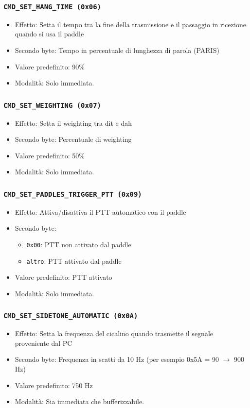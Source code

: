 \subsubsection{\texttt{CMD\_SET\_HANG\_TIME (0x06)}}
\begin{itemize}
	\item Effetto: Setta il tempo tra la fine della trasmissione e il passaggio in ricezione quando si usa il paddle
	\item Secondo byte: Tempo in percentuale di lunghezza di parola (PARIS)
	\item Valore predefinito: 90\%
	\item Modalit\`a: Solo immediata.
\end{itemize}

\subsubsection{\texttt{CMD\_SET\_WEIGHTING (0x07)}}
\begin{itemize}
	\item Effetto: Setta il weighting tra dit e dah
	\item Secondo byte: Percentuale di weighting
	\item Valore predefinito: 50\%
	\item Modalit\`a: Solo immediata.
\end{itemize}

\subsubsection{\texttt{CMD\_SET\_PADDLES\_TRIGGER\_PTT (0x09)}}
\begin{itemize}
	\item Effetto: Attiva/disattiva il PTT automatico con il paddle
	\item Secondo byte:
	\begin{itemize}
		\item \texttt{0x00}: PTT non attivato dal paddle
		\item \texttt{altro}: PTT attivato dal paddle
	\end{itemize}
	\item Valore predefinito: PTT attivato
	\item Modalit\`a: Solo immediata.
\end{itemize}

\subsubsection{\texttt{CMD\_SET\_SIDETONE\_AUTOMATIC (0x0A)}}
\begin{itemize}
	\item Effetto: Setta la frequenza del cicalino quando trasmette il segnale proveniente dal PC
	\item Secondo byte: Frequenza in scatti da 10 Hz (per esempio 0x5A = 90 $\rightarrow$ 900 Hz)
	\item Valore predefinito: 750 Hz
	\item Modalit\`a: Sia immediata che bufferizzabile.
\end{itemize}

